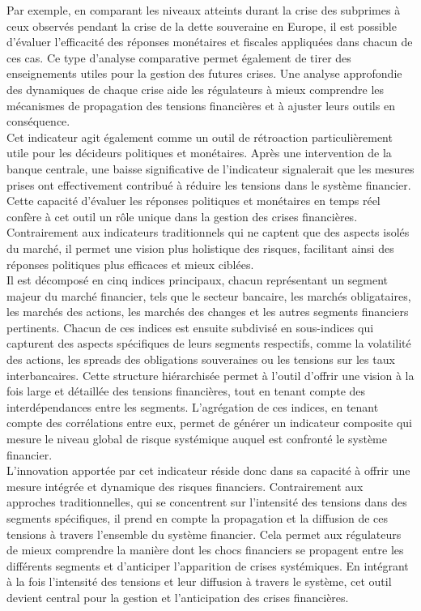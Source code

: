 Par exemple, en comparant les niveaux atteints durant la crise des subprimes à ceux observés pendant la crise de la dette souveraine en Europe, il est possible d’évaluer l’efficacité des réponses monétaires et fiscales appliquées dans chacun de ces cas. Ce type d’analyse comparative permet également de tirer des enseignements utiles pour la gestion des futures crises. Une analyse approfondie des dynamiques de chaque crise aide les régulateurs à mieux comprendre les mécanismes de propagation des tensions financières et à ajuster leurs outils en conséquence.\\

Cet indicateur agit également comme un outil de rétroaction particulièrement utile pour les décideurs politiques et monétaires. Après une intervention de la banque centrale, une baisse significative de l’indicateur signalerait que les mesures prises ont effectivement contribué à réduire les tensions dans le système financier. Cette capacité d’évaluer les réponses politiques et monétaires en temps réel confère à cet outil un rôle unique dans la gestion des crises financières. Contrairement aux indicateurs traditionnels qui ne captent que des aspects isolés du marché, il permet une vision plus holistique des risques, facilitant ainsi des réponses politiques plus efficaces et mieux ciblées.\\

Il est décomposé en cinq indices principaux, chacun représentant un segment majeur du marché financier, tels que le secteur bancaire, les marchés obligataires, les marchés des actions, les marchés des changes et les autres segments financiers pertinents. Chacun de ces indices est ensuite subdivisé en sous-indices qui capturent des aspects spécifiques de leurs segments respectifs, comme la volatilité des actions, les spreads des obligations souveraines ou les tensions sur les taux interbancaires. Cette structure hiérarchisée permet à l’outil d’offrir une vision à la fois large et détaillée des tensions financières, tout en tenant compte des interdépendances entre les segments. L’agrégation de ces indices, en tenant compte des corrélations entre eux, permet de générer un indicateur composite qui mesure le niveau global de risque systémique auquel est confronté le système financier.\\

L’innovation apportée par cet indicateur réside donc dans sa capacité à offrir une mesure intégrée et dynamique des risques financiers. Contrairement aux approches traditionnelles, qui se concentrent sur l’intensité des tensions dans des segments spécifiques, il prend en compte la propagation et la diffusion de ces tensions à travers l’ensemble du système financier. Cela permet aux régulateurs de mieux comprendre la manière dont les chocs financiers se propagent entre les différents segments et d’anticiper l’apparition de crises systémiques. En intégrant à la fois l’intensité des tensions et leur diffusion à travers le système, cet outil devient central pour la gestion et l’anticipation des crises financières.


